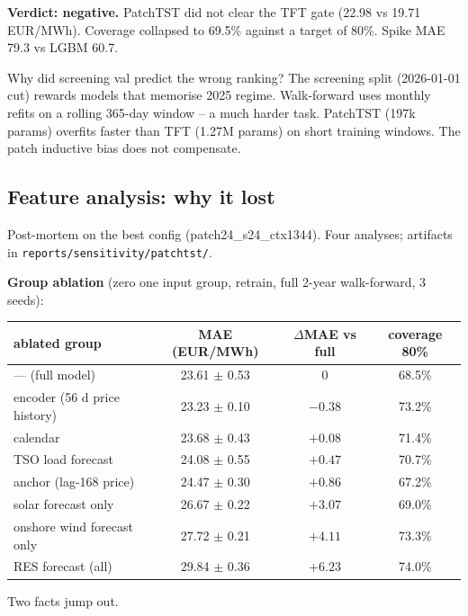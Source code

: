 \textbf{Verdict: negative.} PatchTST did not clear the TFT gate
(22.98 vs 19.71 EUR/MWh). Coverage collapsed to 69.5\% against a
target of 80\%. Spike MAE 79.3 vs LGBM 60.7.

Why did screening val predict the wrong ranking? The screening split
(2026-01-01 cut) rewards models that memorise 2025 regime. Walk-forward
uses monthly refits on a rolling 365-day window -- a much harder task.
PatchTST (197k params) overfits faster than TFT (1.27M params) on short
training windows. The patch inductive bias does not compensate.

\subsection{Feature analysis: why it lost}

Post-mortem on the best config (patch24\_s24\_ctx1344). Four analyses;
artifacts in \texttt{reports/sensitivity/patchtst/}.

\textbf{Group ablation} (zero one input group, retrain, full 2-year
walk-forward, 3 seeds):

\begin{center}
\begin{tabular}{lccc}
\toprule
ablated group & MAE (EUR/MWh) & $\Delta$MAE vs full & coverage 80\% \\
\midrule
--- (full model) & 23.61 $\pm$ 0.53 & 0 & 68.5\% \\
encoder (56 d price history) & 23.23 $\pm$ 0.10 & $-0.38$ & 73.2\% \\
calendar & 23.68 $\pm$ 0.43 & $+0.08$ & 71.4\% \\
TSO load forecast & 24.08 $\pm$ 0.55 & $+0.47$ & 70.7\% \\
anchor (lag-168 price) & 24.47 $\pm$ 0.30 & $+0.86$ & 67.2\% \\
solar forecast only & 26.67 $\pm$ 0.22 & $+3.07$ & 69.0\% \\
onshore wind forecast only & 27.72 $\pm$ 0.21 & $+4.11$ & 73.3\% \\
RES forecast (all) & 29.84 $\pm$ 0.36 & $+6.23$ & 74.0\% \\
\bottomrule
\end{tabular}
\end{center}

Two facts jump out.

